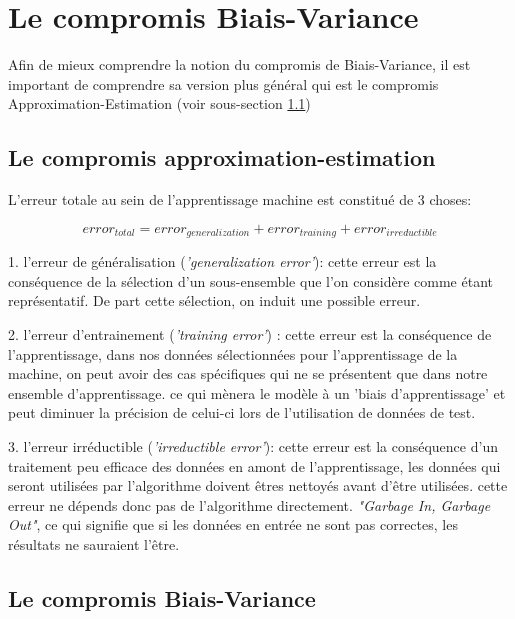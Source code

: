 \documentclass[a4paper]{article}
\begin{document}
\newpage

\section{Le compromis Biais-Variance}
\label{B-V}

Afin de mieux comprendre la notion du compromis de Biais-Variance, il est important de comprendre sa version plus général qui est le compromis Approximation-Estimation (voir sous-section \ref{A-E})

\subsection{Le compromis approximation-estimation}
\label{A-E}
L'erreur totale au sein de l'apprentissage machine est constitué de 3 choses: \newline

\[ error_{total} = error_{generalization} + error_{training} + error_{irreductible} \]

1. l'erreur de généralisation (\textit{'generalization error'}): cette erreur est la conséquence de la sélection d'un sous-ensemble que l'on considère comme étant représentatif. De part cette sélection, on induit une possible erreur.\newline

2. l'erreur d'entrainement (\textit{'training error'}) : cette erreur est la conséquence de l'apprentissage, dans nos données sélectionnées pour l'apprentissage de la machine, on peut avoir des cas spécifiques qui ne se présentent que dans notre ensemble d'apprentissage. ce qui mènera le modèle à un 'biais d'apprentissage' et peut diminuer la précision de celui-ci lors de l'utilisation de données de test.\newline

3. l'erreur irréductible (\textit{'irreductible error'}): cette erreur est la conséquence d'un traitement peu efficace des données en amont de l'apprentissage, les données qui seront utilisées par l'algorithme doivent êtres nettoyés avant d'être utilisées. cette erreur ne dépends donc pas de l'algorithme directement.\newline
 \textit{"Garbage In, Garbage Out"}, ce qui signifie que si les données en entrée ne sont pas correctes, les résultats ne sauraient l'être. \newline

\newpage

\subsection{Le compromis Biais-Variance}
\end{document}
